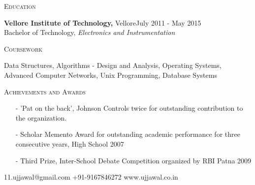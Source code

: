 \documentclass[a4paper, 11pt]{article}
\begin{document}
\vspace{5mm}

\begin{minipage}[t]{0.15\textwidth}
	\small \textsc{Education}
\end{minipage}
\hfill
\begin{minipage}[t]{0.80\textwidth}
	\noindent \textbf{Vellore Institute of Technology,} Vellore\hfill {\scriptsize \textrm{July 2011 - May 2015}}\\
	\small Bachelor of Technology, \textit{Electronics and Instrumentation}\\
\end{minipage}

\vspace{5mm}

\begin{minipage}[t]{0.15\textwidth}
	\small \textsc{Coursework}
\end{minipage}
\hfill
\begin{minipage}[t]{0.80\textwidth}
	\noindent Data Structures, Algorithms - Design and Analysis, Operating Systems, Advanced Computer Networks, Unix Programming, Database Systems
\end{minipage}

\vspace{5mm}

\begin{minipage}[t]{0.15\textwidth}
	\flushleft
	\small \textsc{Achievements and Awards}
\end{minipage}
\hfill
\begin{minipage}[t]{0.80\textwidth}
	\small
	\begin{itemize}[leftmargin=*]
		\item[-] 'Pat on the back', Johnson Controls twice for outstanding contribution to the organization.
		\item[-] Scholar Memento Award for outstanding academic performance for three consecutive years, High School \hfill 2007
		\item[-] Third Prize, Inter-School Debate Competition organized by RBI Patna \hfill 2009
	\end{itemize}
\end{minipage}

\vspace{5mm}
\vspace*{\fill}
\hrulefill 

\color{blue} {11.ujjawal@gmail.com \hfill +91-9167846272 \hfill www.ujjawal.co.in}
\end{document}
